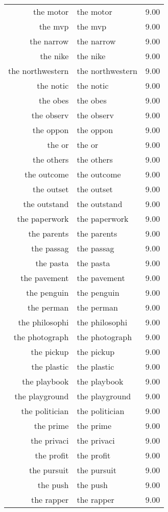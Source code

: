 \begin{table}[ht]
\begin{tabular}{rlr}
  the motor & the motor & 9.00 \\ 
  the mvp & the mvp & 9.00 \\ 
  the narrow & the narrow & 9.00 \\ 
  the nike & the nike & 9.00 \\ 
  the northwestern & the northwestern & 9.00 \\ 
  the notic & the notic & 9.00 \\ 
  the obes & the obes & 9.00 \\ 
  the observ & the observ & 9.00 \\ 
  the oppon & the oppon & 9.00 \\ 
  the or & the or & 9.00 \\ 
  the others & the others & 9.00 \\ 
  the outcome & the outcome & 9.00 \\ 
  the outset & the outset & 9.00 \\ 
  the outstand & the outstand & 9.00 \\ 
  the paperwork & the paperwork & 9.00 \\ 
  the parents & the parents & 9.00 \\ 
  the passag & the passag & 9.00 \\ 
  the pasta & the pasta & 9.00 \\ 
  the pavement & the pavement & 9.00 \\ 
  the penguin & the penguin & 9.00 \\ 
  the perman & the perman & 9.00 \\ 
  the philosophi & the philosophi & 9.00 \\ 
  the photograph & the photograph & 9.00 \\ 
  the pickup & the pickup & 9.00 \\ 
  the plastic & the plastic & 9.00 \\ 
  the playbook & the playbook & 9.00 \\ 
  the playground & the playground & 9.00 \\ 
  the politician & the politician & 9.00 \\ 
  the prime & the prime & 9.00 \\ 
  the privaci & the privaci & 9.00 \\ 
  the profit & the profit & 9.00 \\ 
  the pursuit & the pursuit & 9.00 \\ 
  the push & the push & 9.00 \\ 
  the rapper & the rapper & 9.00 \\ 

\end{tabular}
\end{table}
